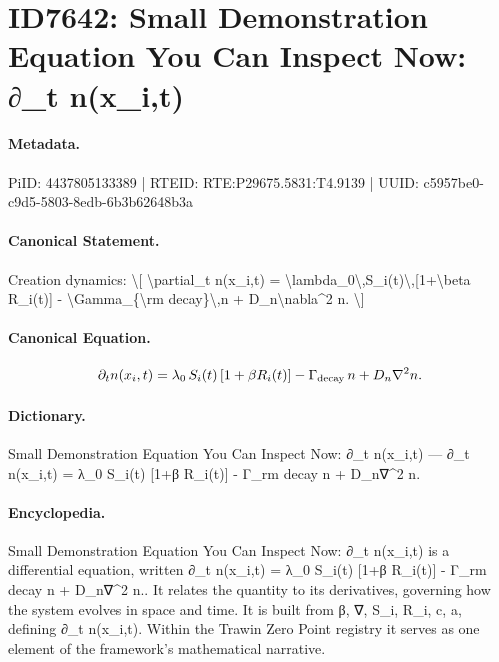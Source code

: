 \section*{ID7642: Small Demonstration Equation You Can Inspect Now: ∂\_t n(x\_i,t)}
\paragraph{Metadata.}
PiID: 4437805133389 | RTEID: RTE:P29675.5831:T4.9139 | UUID: c5957be0-c9d5-5803-8edb-6b3b62648b3a

\paragraph{Canonical Statement.}
Creation dynamics: \textbackslash{}[ \textbackslash{}partial\_t n(x\_i,t) = \textbackslash{}lambda\_0\textbackslash{},S\_i(t)\textbackslash{},[1+\textbackslash{}beta R\_i(t)] - \textbackslash{}Gamma\_\{\textbackslash{}rm decay\}\textbackslash{},n + D\_n\textbackslash{}nabla\textasciicircum{}2 n. \textbackslash{}]

\paragraph{Canonical Equation.}
\[
\partial_t n(x_i,t) = \lambda_0\,S_i(t)\,[1+\beta R_i(t)] - \Gamma_{\rm decay}\,n + D_n\nabla^2 n.
\]

\paragraph{Dictionary.}
Small Demonstration Equation You Can Inspect Now: ∂\_t n(x\_i,t) — ∂\_t n(x\_i,t) = λ\_0 S\_i(t) [1+β R\_i(t)] - Γ\_rm decay n + D\_n∇\textasciicircum{}2 n.

\paragraph{Encyclopedia.}
Small Demonstration Equation You Can Inspect Now: ∂\_t n(x\_i,t) is a differential equation, written ∂\_t n(x\_i,t) = λ\_0 S\_i(t) [1+β R\_i(t)] - Γ\_rm decay n + D\_n∇\textasciicircum{}2 n.. It relates the quantity to its derivatives, governing how the system evolves in space and time. It is built from β, ∇, S\_i, R\_i, c, a, defining ∂\_t n(x\_i,t). Within the Trawin Zero Point registry it serves as one element of the framework's mathematical narrative.
